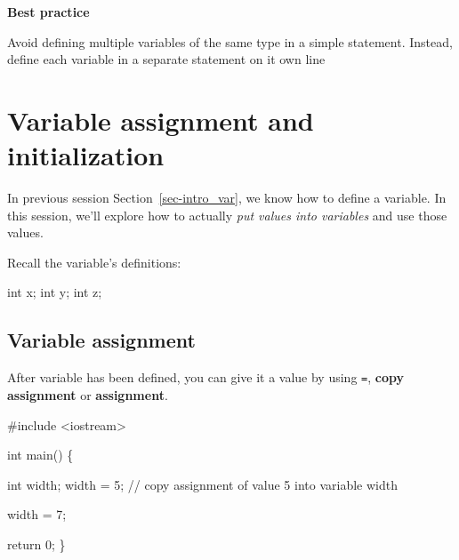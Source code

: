 \documentclass[
  letterpaper,
  DIV=11,
  numbers=noendperiod]{scrreprt}
\newenvironment{Shaded}{\begin{snugshade}}{\end{snugshade}}
\newcommand{\CommentTok}[1]{\textcolor[rgb]{0.37,0.37,0.37}{#1}}
\newcommand{\DecValTok}[1]{\textcolor[rgb]{0.68,0.00,0.00}{#1}}
\newcommand{\ErrorTok}[1]{\textcolor[rgb]{0.68,0.00,0.00}{#1}}
\newcommand{\FunctionTok}[1]{\textcolor[rgb]{0.28,0.35,0.67}{#1}}
\newcommand{\NormalTok}[1]{\textcolor[rgb]{0.00,0.23,0.31}{#1}}
\newcommand{\OtherTok}[1]{\textcolor[rgb]{0.00,0.23,0.31}{#1}}
\newcommand{\SpecialCharTok}[1]{\textcolor[rgb]{0.37,0.37,0.37}{#1}}
\begin{document}
\begin{tcolorbox}[enhanced jigsaw, toprule=.15mm, rightrule=.15mm, opacityback=0, breakable, leftrule=.75mm, colback=white, colframe=quarto-callout-tip-color-frame, arc=.35mm, left=2mm, bottomrule=.15mm]
\begin{minipage}[t]{5.5mm}
\textcolor{quarto-callout-tip-color}{\faLightbulb}
\end{minipage}%
\begin{minipage}[t]{\textwidth - 5.5mm}

\textbf{Best practice}\vspace{2mm}

Avoid defining multiple variables of the same type in a simple
statement. Instead, define each variable in a separate statement on it
own line

\end{minipage}%
\end{tcolorbox}

\hypertarget{variable-assignment-and-initialization}{%
\section{Variable assignment and
initialization}\label{variable-assignment-and-initialization}}

In previous session Section~\ref{sec-intro_var}, we know how to define a
variable. In this session, we'll explore how to actually \emph{put
values into variables} and use those values.

Recall the variable's definitions:

\begin{Shaded}
\begin{Highlighting}[]
\NormalTok{int x;}
\NormalTok{int y;}
\NormalTok{int z;}
\end{Highlighting}
\end{Shaded}

\hypertarget{variable-assignment}{%
\subsection{Variable assignment}\label{variable-assignment}}

After variable has been defined, you can give it a value by using
\texttt{=}, \textbf{copy assignment} or \textbf{assignment}.

\begin{Shaded}
\begin{Highlighting}[]
\CommentTok{\#include \textless{}iostream\textgreater{}}

\NormalTok{int }\FunctionTok{main}\NormalTok{() \{}
  
\NormalTok{  int width;}
\NormalTok{  width }\OtherTok{=} \DecValTok{5}\NormalTok{;  }\SpecialCharTok{/}\ErrorTok{/}\NormalTok{ copy assignment of value }\DecValTok{5}\NormalTok{ into variable width}

\NormalTok{  width }\OtherTok{=} \DecValTok{7}\NormalTok{;}
  
\NormalTok{  return }\DecValTok{0}\NormalTok{;}
\NormalTok{\}}
\end{Highlighting}
\end{Shaded}
\end{document}
